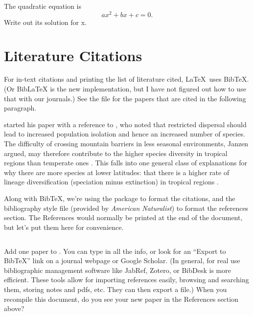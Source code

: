 \documentclass{article}
\begin{document}
The quadratic equation is
\begin{equation}
    a x^2 + b x + c = 0.
\label{eq:quadratic}
\end{equation}
Write out its solution for x.

\section{Literature Citations}
\label{sec:literature}

For in-text citations and printing the list of literature cited, \LaTeX\ uses BibTeX.
(Or BibLaTeX is the new implementation, but I have not figured out how to use that with our journals.)
See the  file for the papers that are cited in the following paragraph.

\citet{Janzen1967} started his paper with a reference to \citet{Simpson1964}, who noted that restricted dispersal should lead to increased population isolation and hence an increased number of species.
The difficulty of crossing mountain barriers in less seasonal environments, Janzen argued, may therefore contribute to the higher species diversity in tropical regions than temperate ones \citep{Ghalambor2006}.
This falls into one general class of explanations for why there are more species at lower latitudes: that there is a higher rate of lineage diversification (speciation minus extinction) in tropical regions               \citep{Ricklefs2006, Weir2007, Mittelbach2007}.

Along with BibTeX, we're using the package  to format the citations, and the bibliography style file  (provided by \emph{American Naturalist}) to format the references section.
The References would normally be printed at the end of the document, but let's put them here for convenience.


\subsection*{\task}

Add one paper to .
You can type in all the info, or look for an ``Export to BibTeX'' link on a journal webpage or Google Scholar.
(In general, for real use bibliographic management software like JabRef, Zotero, or BibDesk is more efficient.
These tools allow for importing references easily, browsing and searching them, storing notes and pdfs, etc.
They can then export a  file.)
When you recompile this document, do you see your new paper in the References section above?
\end{document}
